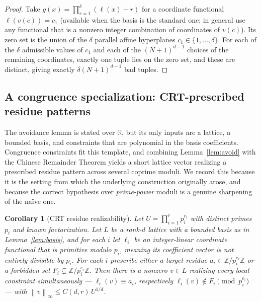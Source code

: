 \documentclass[11pt]{article}
\newtheorem{corollary}{Corollary}
\theoremstyle{definition}
\newcommand{\Z}{\mathbb{Z}}
\newcommand{\R}{\mathbb{R}}
\newcommand{\norm}[1]{\left\lVert #1 \right\rVert}
\begin{document}
\begin{proof}
Take $g(x) = \prod_{r=1}^{\delta}(\ell(x) - r)$ for a coordinate functional
$\ell(v(c)) = c_1$ (available when the basis is the standard one; in general use any
functional that is a nonzero integer combination of coordinates of $v(c)$). Its zero
set is the union of the $\delta$ parallel affine hyperplanes $c_1 \in \{1,\dots,\delta\}$.
For each of the $\delta$ admissible values of $c_1$ and each of the $(N+1)^{d-1}$ choices
of the remaining coordinates, exactly one tuple lies on the zero set, and these are
distinct, giving exactly $\delta(N+1)^{d-1}$ bad tuples.
\end{proof}

\subsection{A congruence specialization: CRT-prescribed residue patterns}

The avoidance lemma is stated over $\R$, but its only inputs are a lattice, a bounded
basis, and constraints that are polynomial in the basis coefficients. Congruence
constraints fit this template, and combining Lemma~\ref{lem:avoid} with the Chinese
Remainder Theorem yields a short lattice vector realizing a prescribed residue pattern
across several coprime moduli. We record this because it is the setting from which the
underlying construction originally arose, and because the correct hypothesis over
\emph{prime-power} moduli is a genuine sharpening of the na\"ive one.

\begin{corollary}[CRT residue realizability]\label{cor:crt}
Let $U = \prod_{i=1}^{r} p_i^{e_i}$ with distinct primes $p_i$ and known factorization.
Let $L$ be a rank-$d$ lattice with a bounded basis as in Lemma~\ref{lem:basis}, and for
each $i$ let $\ell_i$ be an integer-linear coordinate functional that is \emph{primitive
modulo $p_i$}, meaning its coefficient vector is not entirely divisible by $p_i$. For
each $i$ prescribe either a target residue $a_i \in \Z/p_i^{e_i}\Z$ or a forbidden set
$F_i \subsetneq \Z/p_i^{e_i}\Z$. Then there is a nonzero $v \in L$ realizing every local
constraint simultaneously --- $\ell_i(v) \equiv a_i$, respectively $\ell_i(v) \notin F_i
\pmod{p_i^{e_i}}$ --- with $\norm{v}_\infty \le C(d,r)\,U^{1/d}$.
\end{corollary}
\end{document}
